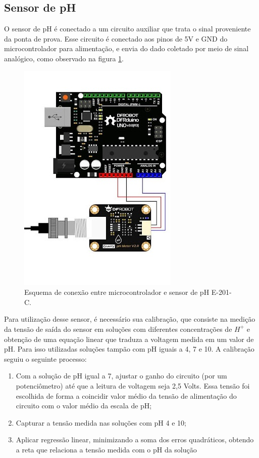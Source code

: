 \subsection{Sensor de pH}

O sensor de pH é conectado a um circuito auxiliar que trata o sinal proveniente da ponta de prova. Esse circuito é conectado aos pinos de 5V e GND do microcontrolador para alimentação, e envia do dado coletado por meio de sinal analógico, como observado na figura \ref{fig:micro_ph}. 


\begin{figure}[h]
    \centering
    \includegraphics[scale=0.65]{figuras/implementacao/hardware/micro_ph.jpg}
    \caption{Esquema de conexão entre microcontrolador e sensor de pH E-201-C.}
    \label{fig:micro_ph}
\end{figure}


Para utilização desse sensor, é necessário sua calibração, que consiste na medição da tensão de saída do sensor em soluções com diferentes concentrações de \(H^+\) e obtenção de uma equação linear que traduza a voltagem medida em um valor de pH. Para isso utilizadas soluções tampão com pH iguais a 4, 7 e 10. A calibração seguiu o seguinte processo:
\begin{enumerate}
    \item Com a solução de pH igual a 7, ajustar o ganho do circuito (por um potenciômetro) até que a leitura de voltagem seja 2,5 Volts. Essa tensão foi escolhida de forma a coincidir valor médio da tensão de alimentação do circuito com o valor médio da escala de pH;
    \item Capturar a tensão medida nas soluções com pH 4 e 10;
    \item Aplicar regressão linear, minimizando a soma dos erros quadráticos, obtendo a reta que relaciona a tensão medida com o pH da solução
\end{enumerate}


